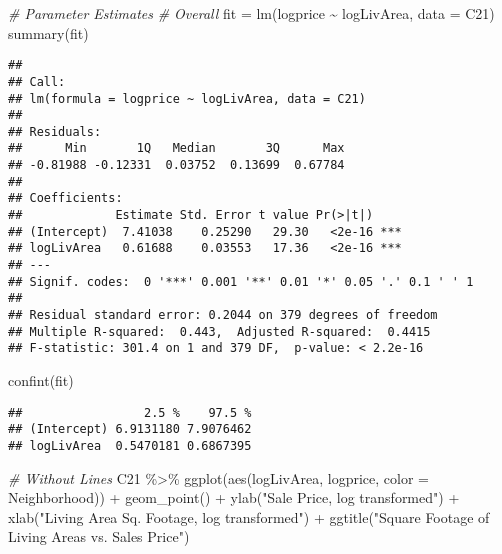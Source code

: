 \documentclass[
]{article}
\newenvironment{Shaded}{\begin{snugshade}}{\end{snugshade}}
\newcommand{\AttributeTok}[1]{\textcolor[rgb]{0.77,0.63,0.00}{#1}}
\newcommand{\CommentTok}[1]{\textcolor[rgb]{0.56,0.35,0.01}{\textit{#1}}}
\newcommand{\FunctionTok}[1]{\textcolor[rgb]{0.00,0.00,0.00}{#1}}
\newcommand{\NormalTok}[1]{#1}
\newcommand{\OtherTok}[1]{\textcolor[rgb]{0.56,0.35,0.01}{#1}}
\newcommand{\SpecialCharTok}[1]{\textcolor[rgb]{0.00,0.00,0.00}{#1}}
\newcommand{\StringTok}[1]{\textcolor[rgb]{0.31,0.60,0.02}{#1}}
\begin{document}
\begin{Shaded}
\begin{Highlighting}[]
\CommentTok{\# Parameter Estimates}
\CommentTok{\# Overall}
\NormalTok{fit }\OtherTok{=} \FunctionTok{lm}\NormalTok{(logprice }\SpecialCharTok{\textasciitilde{}}\NormalTok{ logLivArea, }\AttributeTok{data =}\NormalTok{ C21)}
\FunctionTok{summary}\NormalTok{(fit)}
\end{Highlighting}
\end{Shaded}

\begin{verbatim}
## 
## Call:
## lm(formula = logprice ~ logLivArea, data = C21)
## 
## Residuals:
##      Min       1Q   Median       3Q      Max 
## -0.81988 -0.12331  0.03752  0.13699  0.67784 
## 
## Coefficients:
##             Estimate Std. Error t value Pr(>|t|)    
## (Intercept)  7.41038    0.25290   29.30   <2e-16 ***
## logLivArea   0.61688    0.03553   17.36   <2e-16 ***
## ---
## Signif. codes:  0 '***' 0.001 '**' 0.01 '*' 0.05 '.' 0.1 ' ' 1
## 
## Residual standard error: 0.2044 on 379 degrees of freedom
## Multiple R-squared:  0.443,  Adjusted R-squared:  0.4415 
## F-statistic: 301.4 on 1 and 379 DF,  p-value: < 2.2e-16
\end{verbatim}

\begin{Shaded}
\begin{Highlighting}[]
\FunctionTok{confint}\NormalTok{(fit)}
\end{Highlighting}
\end{Shaded}

\begin{verbatim}
##                 2.5 %    97.5 %
## (Intercept) 6.9131180 7.9076462
## logLivArea  0.5470181 0.6867395
\end{verbatim}

\begin{Shaded}
\begin{Highlighting}[]
\CommentTok{\# Without Lines}
\NormalTok{C21 }\SpecialCharTok{\%\textgreater{}\%} \FunctionTok{ggplot}\NormalTok{(}\FunctionTok{aes}\NormalTok{(logLivArea, logprice, }\AttributeTok{color =}\NormalTok{ Neighborhood)) }\SpecialCharTok{+}
  \FunctionTok{geom\_point}\NormalTok{() }\SpecialCharTok{+}
  \FunctionTok{ylab}\NormalTok{(}\StringTok{"Sale Price, log transformed"}\NormalTok{) }\SpecialCharTok{+} 
  \FunctionTok{xlab}\NormalTok{(}\StringTok{"Living Area Sq. Footage, log transformed"}\NormalTok{) }\SpecialCharTok{+} 
  \FunctionTok{ggtitle}\NormalTok{(}\StringTok{"Square Footage of Living Areas vs. Sales Price"}\NormalTok{)}
\end{Highlighting}
\end{Shaded}
\end{document}
